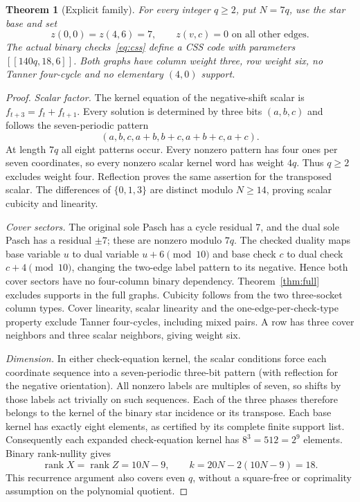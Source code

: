 \documentclass[11pt]{article}
\newtheorem{theorem}{Theorem}[section]
\begin{document}
\begin{theorem}[Explicit family]\label{thm:family}
For every integer $q\geq2$, put $N=7q$, use the star base and set
\begin{equation}\label{eq:labels}
 z(0,0)=z(4,6)=7,\qquad z(v,c)=0\text{ on all other edges}.
\end{equation}
The actual binary checks~\eqref{eq:css} define a CSS code with parameters
$[[140q,18,6]]$. Both graphs have column weight three, row weight six, no
Tanner four-cycle and no elementary $(4,0)$ support.
\end{theorem}
\begin{proof}
\emph{Scalar factor.} The kernel equation of the negative-shift scalar is
$f_{t+3}=f_t+f_{t+1}$. Every solution is determined by three bits $(a,b,c)$
and follows the seven-periodic pattern
\[
 (a,b,c,a+b,b+c,a+b+c,a+c).
\]
At length $7q$ all eight patterns occur. Every nonzero pattern has four ones
per seven coordinates, so every nonzero scalar kernel word has weight $4q$.
Thus $q\geq2$ excludes weight four. Reflection proves the same assertion for
the transposed scalar. The differences of $\{0,1,3\}$ are distinct modulo
$N\geq14$, proving scalar cubicity and linearity.

\emph{Cover sectors.} The original sole Pasch has a cycle residual $7$,
and the dual sole Pasch has a residual $\pm7$; these are nonzero modulo $7q$.
The checked duality maps base variable $u$ to dual variable $u+6\pmod{10}$
and base check $c$ to dual check $c+4\pmod{10}$, changing the two-edge label
pattern to its negative. Hence both cover sectors have no four-column binary
dependency. Theorem~\ref{thm:full} excludes supports in the full graphs.
Cubicity follows from the two three-socket column types. Cover linearity,
scalar linearity and the one-edge-per-check-type property exclude Tanner
four-cycles, including mixed pairs. A row has three cover neighbors and three
scalar neighbors, giving weight six.

\emph{Dimension.} In either check-equation kernel, the scalar conditions force
each coordinate sequence into a seven-periodic three-bit pattern (with
reflection for the negative orientation). All nonzero labels are multiples of
seven, so shifts by those labels act trivially on such sequences. Each of the
three phases therefore belongs to the kernel of the binary star incidence or
its transpose. Each base kernel has exactly eight elements, as certified by
its complete finite support list. Consequently each expanded check-equation
kernel has $8^3=512=2^9$ elements. Binary rank-nullity gives
\[
 \operatorname{rank}X=\operatorname{rank}Z=10N-9,
 \qquad k=20N-2(10N-9)=18.
\]
This recurrence argument also covers even $q$, without a square-free or
coprimality assumption on the polynomial quotient.


\end{proof}
\end{document}
